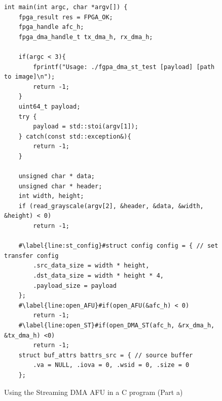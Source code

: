 \documentclass[11pt, twoside, pdftex]{article}
\begin{document}
 \lstset{language=C,numbers=left,escapechar=\#}
\begin{figure}[h]
\begin{center}
\begin{minipage}[h]{\textwidth}
\begin{lstlisting}[name=stdma_C_code]
int main(int argc, char *argv[]) {
	fpga_result res = FPGA_OK;
	fpga_handle afc_h;
	fpga_dma_handle_t tx_dma_h, rx_dma_h;
	
	if(argc < 3){
		fprintf("Usage: ./fgpa_dma_st_test [payload] [path to image]\n");
		return -1;
	}
	uint64_t payload; 
	try {
		payload = std::stoi(argv[1]);
	} catch(const std::exception&){
		return -1;
	}
	
	unsigned char * data;
	unsigned char * header;
	int width, height;
	if (read_grayscale(argv[2], &header, &data, &width, &height) < 0)
		return -1;
	
	#\label{line:st_config}#struct config config = { // set transfer config
		.src_data_size = width * height,
		.dst_data_size = width * height * 4,
		.payload_size = payload
	};
	#\label{line:open_AFU}#if(open_AFU(&afc_h) < 0)
		return -1;
	#\label{line:open_ST}#if(open_DMA_ST(afc_h, &rx_dma_h, &tx_dma_h) <0)
		return -1;
	struct buf_attrs battrs_src = { // source buffer
		.va = NULL, .iova = 0, .wsid = 0, .size = 0
	};
\end{lstlisting}
\end{minipage}
\caption{Using the Streaming DMA AFU in a C program (Part a)}
\label{fig:C_stdma}
\end{center}
\end{figure}
\end{document}
